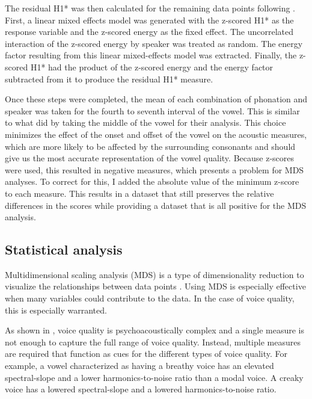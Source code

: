 The residual H1* was then calculated for the remaining data points following \citet{chaiH1H2AcousticMeasure2022}. First, a linear mixed effects model was generated with the z-scored H1* as the response variable and the z-scored energy as the fixed effect. The uncorrelated interaction of the z-scored energy by speaker was treated as random. The energy factor resulting from this linear mixed-effects model was extracted. Finally, the z-scored H1* had the product of the z-scored energy and the energy factor subtracted from it to produce the residual H1* measure. 

Once these steps were completed, the mean of each combination of phonation and speaker was taken for the fourth to seventh interval of the vowel. This is similar to what \citet{keatingCrosslanguageAcousticSpace2023} did by taking the middle of the vowel for their analysis. This choice minimizes the effect of the onset and offset of the vowel on the acoustic measures, which are more likely to be affected by the surrounding consonants and should give us the most accurate representation of the vowel quality. Because z-scores were used, this resulted in negative measures, which presents a problem for MDS analyses. To correct for this, I added the absolute value of the minimum z-score to each measure. This results in a dataset that still preserves the relative differences in the scores while providing a dataset that is all positive for the MDS analysis.

\subsection{Statistical analysis} \label{sec:acousticlandscape:statistics}

Multidimensional scaling analysis (MDS) is a type of dimensionality reduction to visualize the relationships between data points \citep{kruskalMultidimensionalScaling1978}. Using MDS is especially effective when many variables could contribute to the data. In the case of voice quality, this is especially warranted. 

As shown in \citet{kreimanUnifiedTheoryVoice2014,kreimanValidatingPsychoacousticModel2021,garellekAcousticDiscriminabilityComplex2020}, voice quality is psychoacoustically complex and a single measure is not enough to capture the full range of voice quality. Instead, multiple measures are required that function as cues for the different types of voice quality. For example, a vowel characterized as having a breathy voice has an elevated spectral-slope and a lower harmonics-to-noise ratio than a modal voice. A creaky voice has a lowered spectral-slope and a lowered harmonics-to-noise ratio. 

